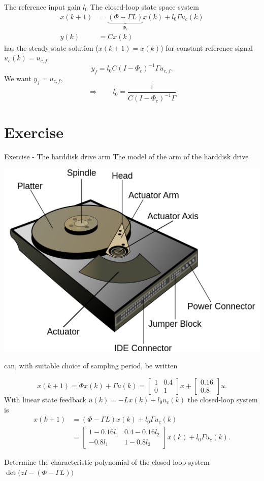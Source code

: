\documentclass[presentation,aspectratio=1610]{beamer}
\begin{document}
\begin{frame}[label={sec:org6cebb83}]{The reference input gain \(l_0\)}
The closed-loop state space system
\begin{equation*}
\begin{split}
 x(k+1) &= \underbrace{\left(\Phi -\Gamma L \right)}_{\Phi_c} x(k) + l_0\Gamma u_c(k)\\
 y(k) &= C x(k)
\end{split}
\end{equation*}
has the steady-state solution (\(x(k+1)=x(k)\)) for constant reference signal \(u_c(k) = u_{c,f}\)
\[ y_f = l_0 C(I - \Phi_c)^{-1}\Gamma u_{c,f}.\]
We want \(y_f =  u_{c,f}\),
\[ \Rightarrow \qquad l_0 = \frac{1}{C(I-\Phi_c)^{-1}\Gamma}\]
\end{frame}

\section{Exercise}
\label{sec:org0d8e2aa}

\begin{frame}[label={sec:org31fcf52}]{Exercise - The harddisk drive arm}
\footnotesize
The model of the arm of the harddisk drive
\begin{center}
\includegraphics[width=0.2\linewidth]{../../figures/hard-drive.png}
\end{center}
can, with suitable choice of sampling period, be written

\[x(k+1) = \Phi x(k) + \Gamma u(k) = \begin{bmatrix} 1 & 0.4\\ 0 &1 \end{bmatrix} x + \begin{bmatrix}0.16\\0.8\end{bmatrix}u.\]
With linear state feedback \(u(k) = -Lx(k) + l_0u_c(k)\) the closed-loop system is
\begin{equation*}
   \begin{split}
    x(k+1) &= \left(\Phi -\Gamma L \right) x(k) + l_0\Gamma u_c(k)\\
           &= \begin{bmatrix} 1-0.16l_1 & 0.4 - 0.16l_2\\-0.8l_1 & 1-0.8l_2\end{bmatrix} x(k) + l_0\Gamma u_c(k).
   \end{split}
\end{equation*}

\alert{Determine} the characteristic polynomial of the closed-loop system \(\det \Big( zI - (\Phi - \Gamma L)\Big)\)
\end{frame}
\end{document}
